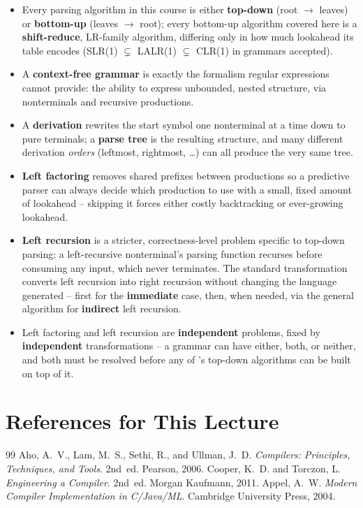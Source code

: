 \documentclass[full-course-notes.tex]{subfiles}
\begin{document}
\begin{takeaways}
\begin{itemize}
  \item Every parsing algorithm in this course is either \textbf{top-down} (root $\to$ leaves)
  or \textbf{bottom-up} (leaves $\to$ root); every bottom-up algorithm covered here is a
  \textbf{shift-reduce}, LR-family algorithm, differing only in how much lookahead its table
  encodes (SLR(1) $\subsetneq$ LALR(1) $\subsetneq$ CLR(1) in grammars accepted).
  \item A \textbf{context-free grammar} is exactly the formalism regular expressions cannot
  provide: the ability to express unbounded, nested structure, via nonterminals and recursive
  productions.
  \item A \textbf{derivation} rewrites the start symbol one nonterminal at a time down to pure
  terminals; a \textbf{parse tree} is the resulting structure, and many different derivation
  \emph{orders} (leftmost, rightmost, \dots) can all produce the very same tree.
  \item \textbf{Left factoring} removes shared prefixes between productions so a predictive
  parser can always decide which production to use with a small, fixed amount of lookahead --
  skipping it forces either costly backtracking or ever-growing lookahead.
  \item \textbf{Left recursion} is a stricter, correctness-level problem specific to top-down
  parsing: a left-recursive nonterminal's parsing function recurses before consuming any input,
  which never terminates. The standard transformation converts left recursion into right
  recursion without changing the language generated -- first for the \textbf{immediate} case,
  then, when needed, via the general algorithm for \textbf{indirect} left recursion.
  \item Left factoring and left recursion are \textbf{independent} problems, fixed by
  \textbf{independent} transformations -- a grammar can have either, both, or neither, and both
  must be resolved before any of 's top-down algorithms can be built on
  top of it.
\end{itemize}
\end{takeaways}

\section*{References for This Lecture}
\begin{thebibliography}{99}
 Aho, A.~V., Lam, M.~S., Sethi, R., and Ullman, J.~D. \textit{Compilers:
Principles, Techniques, and Tools}. 2nd~ed. Pearson, 2006.
 Cooper, K.~D. and Torczon, L. \textit{Engineering a Compiler}. 2nd~ed. Morgan
Kaufmann, 2011.
 Appel, A.~W. \textit{Modern Compiler Implementation in C/Java/ML}. Cambridge
University Press, 2004.
\end{thebibliography}
\end{document}
